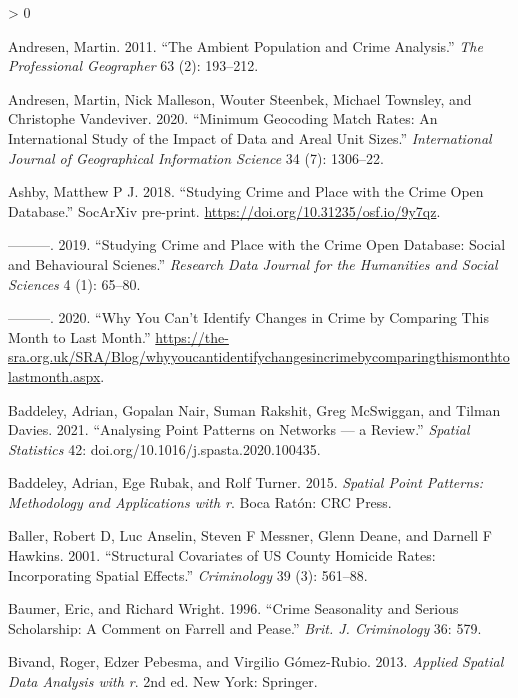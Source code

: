 \documentclass[
  krantz2]{krantz}
\newlength{\cslhangindent}
\newenvironment{CSLReferences}[2] %
 {%
  \setlength{\parindent}{0pt}
  \ifodd #1 \everypar{\setlength{\hangindent}{\cslhangindent}}\ignorespaces\fi
  \ifnum #2 > 0
  \setlength{\parskip}{#2\baselineskip}
  \fi
 }%
 {}
\begin{document}
\hypertarget{refs}{}
\begin{CSLReferences}{1}{0}
\leavevmode\hypertarget{ref-Andresen_2011}{}%
Andresen, Martin. 2011. {``The Ambient Population and Crime Analysis.''} \emph{The Professional Geographer} 63 (2): 193--212.

\leavevmode\hypertarget{ref-Andresen_2020}{}%
Andresen, Martin, Nick Malleson, Wouter Steenbek, Michael Townsley, and Christophe Vandeviver. 2020. {``Minimum Geocoding Match Rates: An International Study of the Impact of Data and Areal Unit Sizes.''} \emph{International Journal of Geographical Information Science} 34 (7): 1306--22.

\leavevmode\hypertarget{ref-Ashby_2018}{}%
Ashby, Matthew P J. 2018. {``Studying Crime and Place with the Crime Open Database.''} SocArXiv pre-print. \url{https://doi.org/10.31235/osf.io/9y7qz}.

\leavevmode\hypertarget{ref-Ashby_2019}{}%
---------. 2019. {``Studying Crime and Place with the Crime Open Database: Social and Behavioural Scienes.''} \emph{Research Data Journal for the Humanities and Social Sciences} 4 (1): 65--80.

\leavevmode\hypertarget{ref-Ashby_2020}{}%
---------. 2020. {``Why You Can't Identify Changes in Crime by Comparing This Month to Last Month.''} \url{https://the-sra.org.uk/SRA/Blog/whyyoucantidentifychangesincrimebycomparingthismonthtolastmonth.aspx}.

\leavevmode\hypertarget{ref-Baddeley_2021}{}%
Baddeley, Adrian, Gopalan Nair, Suman Rakshit, Greg McSwiggan, and Tilman Davies. 2021. {``Analysing Point Patterns on Networks --- a Review.''} \emph{Spatial Statistics} 42: doi.org/10.1016/j.spasta.2020.100435.

\leavevmode\hypertarget{ref-Baddeley_2016}{}%
Baddeley, Adrian, Ege Rubak, and Rolf Turner. 2015. \emph{Spatial Point Patterns: Methodology and Applications with r}. Boca Ratón: CRC Press.

\leavevmode\hypertarget{ref-Baller_2001}{}%
Baller, Robert D, Luc Anselin, Steven F Messner, Glenn Deane, and Darnell F Hawkins. 2001. {``Structural Covariates of US County Homicide Rates: Incorporating Spatial Effects.''} \emph{Criminology} 39 (3): 561--88.

\leavevmode\hypertarget{ref-Baumer_1996}{}%
Baumer, Eric, and Richard Wright. 1996. {``Crime Seasonality and Serious Scholarship: A Comment on Farrell and Pease.''} \emph{Brit. J. Criminology} 36: 579.

\leavevmode\hypertarget{ref-Bivand_2013}{}%
Bivand, Roger, Edzer Pebesma, and Virgilio Gómez-Rubio. 2013. \emph{Applied Spatial Data Analysis with r}. 2nd ed. New York: Springer.


\end{CSLReferences}
\end{document}
